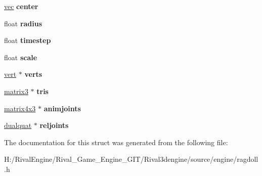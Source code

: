 \begin{DoxyCompactItemize}
\item 
\mbox{\label{structragdolldata_a6b455a49525060232c2a6edc43474804}} 
\hyperlink{structvec}{vec} {\bfseries center}
\item 
\mbox{\label{structragdolldata_a6ef8eafbf47dadc31983ce9a0148b21f}} 
float {\bfseries radius}
\item 
\mbox{\label{structragdolldata_ac67ce22076b0d8ce63c3c4ea84e4c869}} 
float {\bfseries timestep}
\item 
\mbox{\label{structragdolldata_aa2b16b255f7d83c9ec6b83160d8a0462}} 
float {\bfseries scale}
\item 
\mbox{\label{structragdolldata_ad16774594fa00b1d03fb2b42cf85be90}} 
\hyperlink{structragdolldata_1_1vert}{vert} $\ast$ {\bfseries verts}
\item 
\mbox{\label{structragdolldata_a1d56479fb58be82685d0b0599e281372}} 
\hyperlink{structmatrix3}{matrix3} $\ast$ {\bfseries tris}
\item 
\mbox{\label{structragdolldata_ad5988c82faac1825101fa0d959017188}} 
\hyperlink{structmatrix4x3}{matrix4x3} $\ast$ {\bfseries animjoints}
\item 
\mbox{\label{structragdolldata_a992d2d92bfa5570d9c43ef0d8c696073}} 
\hyperlink{structdualquat}{dualquat} $\ast$ {\bfseries reljoints}
\end{DoxyCompactItemize}


The documentation for this struct was generated from the following file\+:\begin{DoxyCompactItemize}
\item 
H\+:/\+Rival\+Engine/\+Rival\+\_\+\+Game\+\_\+\+Engine\+\_\+\+G\+I\+T/\+Rival3dengine/source/engine/ragdoll.\+h\end{DoxyCompactItemize}
